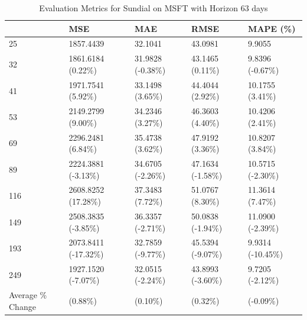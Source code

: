\begin{table}
\caption{Evaluation Metrics for Sundial on MSFT with Horizon 63 days}
\label{tab:sundial_MSFT_h63_metrics}
\begin{tabular}{lllll}
\toprule
 & MSE & MAE & RMSE & MAPE (\%) \\
\midrule
25 & 1857.4439 & 32.1041 & 43.0981 & 9.9055 \\
32 & 1861.6184 (0.22\%) & 31.9828 (-0.38\%) & 43.1465 (0.11\%) & 9.8396 (-0.67\%) \\
41 & 1971.7541 (5.92\%) & 33.1498 (3.65\%) & 44.4044 (2.92\%) & 10.1755 (3.41\%) \\
53 & 2149.2799 (9.00\%) & 34.2346 (3.27\%) & 46.3603 (4.40\%) & 10.4206 (2.41\%) \\
69 & 2296.2481 (6.84\%) & 35.4738 (3.62\%) & 47.9192 (3.36\%) & 10.8207 (3.84\%) \\
89 & 2224.3881 (-3.13\%) & 34.6705 (-2.26\%) & 47.1634 (-1.58\%) & 10.5715 (-2.30\%) \\
116 & 2608.8252 (17.28\%) & 37.3483 (7.72\%) & 51.0767 (8.30\%) & 11.3614 (7.47\%) \\
149 & 2508.3835 (-3.85\%) & 36.3357 (-2.71\%) & 50.0838 (-1.94\%) & 11.0900 (-2.39\%) \\
193 & 2073.8411 (-17.32\%) & 32.7859 (-9.77\%) & 45.5394 (-9.07\%) & 9.9314 (-10.45\%) \\
249 & 1927.1520 (-7.07\%) & 32.0515 (-2.24\%) & 43.8993 (-3.60\%) & 9.7205 (-2.12\%) \\
Average \% Change & (0.88\%) & (0.10\%) & (0.32\%) & (-0.09\%) \\
\bottomrule
\end{tabular}
\end{table}
